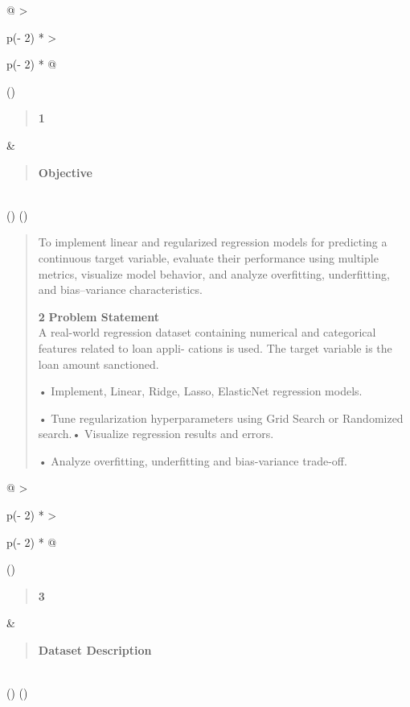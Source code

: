 \documentclass[
]{article}
\begin{document}
\begin{longtable}[]{@{}
  >{\raggedright\arraybackslash}p{(\columnwidth - 2\tabcolsep) * }
  >{\raggedright\arraybackslash}p{(\columnwidth - 2\tabcolsep) * }@{}}
\toprule()
\begin{minipage}[b]{\linewidth}\raggedright
\begin{quote}
\textbf{1}
\end{quote}
\end{minipage} & \begin{minipage}[b]{\linewidth}\raggedright
\begin{quote}
\textbf{Objective}
\end{quote}
\end{minipage} \\
\midrule()
\endhead
\bottomrule()
\end{longtable}

\begin{quote}
To implement linear and regularized regression models for predicting a
continuous target variable, evaluate their performance using multiple
metrics, visualize model behavior, and analyze overfitting,
underfitting, and bias--variance characteristics.

\textbf{2} \textbf{Problem Statement}\\
A real-world regression dataset containing numerical and categorical
features related to loan appli- cations is used. The target variable is
the loan amount sanctioned.

• Implement, Linear, Ridge, Lasso, ElasticNet regression models.

• Tune regularization hyperparameters using Grid Search or Randomized
search.• Visualize regression results and errors.

• Analyze overfitting, underfitting and bias-variance trade-off.
\end{quote}

\begin{longtable}[]{@{}
  >{\raggedright\arraybackslash}p{(\columnwidth - 2\tabcolsep) * }
  >{\raggedright\arraybackslash}p{(\columnwidth - 2\tabcolsep) * }@{}}
\toprule()
\begin{minipage}[b]{\linewidth}\raggedright
\begin{quote}
\textbf{3}
\end{quote}
\end{minipage} & \begin{minipage}[b]{\linewidth}\raggedright
\begin{quote}
\textbf{Dataset Description}
\end{quote}
\end{minipage} \\
\midrule()
\endhead
\bottomrule()
\end{longtable}
\end{document}
